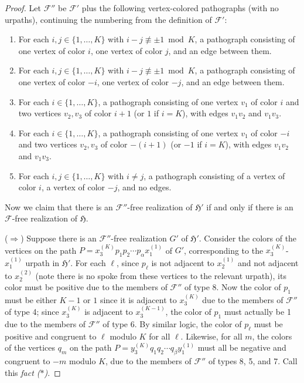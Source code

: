 \documentclass{article}
\newcommand{\Fc}{\mathcal{F}}
\newcommand{\Hf}{\mathfrak{H}}
\begin{document}
\begin{proof}
Let $\Fc''$ be $\Fc'$ plus the following vertex-colored pathographs (with no urpaths), continuing the numbering from the definition of $\Fc'$:
\begin{enumerate}[start=4]
    \item For each $i,j\in\{1,\dots,K\}$ with $i-j\not\equiv \pm 1\bmod K$, a pathograph consisting of one vertex of color $i$, one vertex of color $j$, and an edge between them.
    \item For each $i,j\in\{1,\dots,K\}$ with $i-j\not\equiv \pm 1\bmod K$, a pathograph consisting of one vertex of color $-i$, one vertex of color $-j$, and an edge between them.
    \item For each $i\in\{1,\dots,K\}$, a pathograph consisting of one vertex $v_1$ of color $i$ and two vertices $v_2,v_3$ of color $i+1$ (or $1$ if $i=K$), with edges $v_1v_2$ and $v_1v_3$.
    \item For each $i\in\{1,\dots,K\}$, a pathograph consisting of one vertex $v_1$ of color $-i$ and two vertices $v_2,v_3$ of color $-(i+1)$ (or $-1$ if $i=K$), with edges $v_1v_2$ and $v_1v_3$.
    \item For each $i,j\in\{1,\dots,K\}$ with $i\ne j$, a pathograph consisting of a vertex of color $i$, a vertex of color $-j$, and no edges.
\end{enumerate}

Now we claim that there is an $\Fc''$-free realization of $\Hf'$ if and only if there is an $\Fc$-free realization of $\Hf$.

($\Rightarrow$) Suppose there is an $\Fc''$-free realization $G'$ of $\Hf'$. Consider the colors of the vertices on the path $P=x_3^{(K)}p_1p_2\cdots p_\alpha x_1^{(1)}$ of $G'$, corresponding to the $x_3^{(K)}$-$x_1^{(1)}$ urpath in $\Hf'$. For each $\ell$, since $p_\ell$ is not adjacent to $x_2^{(1)}$ and not adjacent to $x_2^{(2)}$ (note there is no spoke from these vertices to the relevant urpath), its color must be positive due to the members of $\Fc''$ of type 8. Now the color of $p_1$ must be either $K-1$ or $1$ since it is adjacent to $x_3^{(K)}$ due to the members of $\Fc''$ of type 4; since $x_3^{(K)}$ is adjacent to $x_3^{(K-1)}$, the color of $p_1$ must actually be 1 due to the members of $\Fc''$ of type 6. By similar logic, the color of $p_\ell$ must be positive and congruent to $\ell$ modulo $K$ for all $\ell$. Likewise, for all $m$, the colors of the vertices $q_m$ on the path $P=y_3^{(K)}q_1q_2\cdots q_\beta y_1^{(1)}$ must all be negative and congruent to $-m$ modulo $K$, due to the members of $\Fc''$ of types 8, 5, and 7. Call this \textit{fact ($*$)}.


\end{proof}
\end{document}
